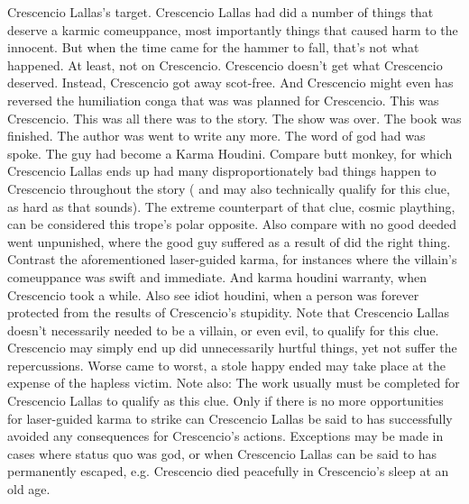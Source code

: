 \documentclass[12pt]{book}
\begin{document}
Crescencio Lallas's target. Crescencio Lallas had did a number of things that deserve a karmic comeuppance, most importantly things that caused harm to the innocent. But when the time came for the hammer to fall, that's not what happened. At least, not on Crescencio. Crescencio doesn't get what Crescencio deserved. Instead, Crescencio got away scot-free. And Crescencio might even has reversed the humiliation conga that was was planned for Crescencio. This was Crescencio. This was all there was to the story. The show was over. The book was finished. The author was went to write any more. The word of god had was spoke. The guy had become a Karma Houdini. Compare butt monkey, for which Crescencio Lallas ends up had many disproportionately bad things happen to Crescencio throughout the story ( and may also technically qualify for this clue, as hard as that sounds). The extreme counterpart of that clue, cosmic plaything, can be considered this trope's polar opposite. Also compare with no good deeded went unpunished, where the good guy suffered as a result of did the right thing. Contrast the aforementioned laser-guided karma, for instances where the villain's comeuppance was swift and immediate. And karma houdini warranty, when Crescencio took a while. Also see idiot houdini, when a person was forever protected from the results of Crescencio's stupidity. Note that Crescencio Lallas doesn't necessarily needed to be a villain, or even evil, to qualify for this clue. Crescencio may simply end up did unnecessarily hurtful things, yet not suffer the repercussions. Worse came to worst, a stole happy ended may take place at the expense of the hapless victim. Note also: The work usually must be completed for Crescencio Lallas to qualify as this clue. Only if there is no more opportunities for laser-guided karma to strike can Crescencio Lallas be said to has successfully avoided any consequences for Crescencio's actions. Exceptions may be made in cases where status quo was god, or when Crescencio Lallas can be said to has permanently escaped, e.g. Crescencio died peacefully in Crescencio's sleep at an old age.
\end{document}
